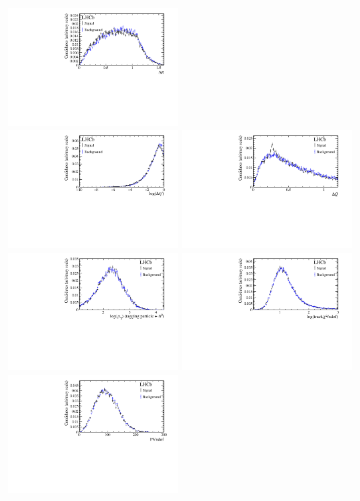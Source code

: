 \begin{figure}[tbp]
\begin{center}
		\includegraphics[width=0.40\textwidth]{09FlavourTagging/figs/BDT_TagPart_B_deltaR.pdf}\\
		\includegraphics[width=0.40\textwidth]{09FlavourTagging/figs/BDT_deta_flat_log.pdf}
		\includegraphics[width=0.40\textwidth]{09FlavourTagging/figs/BDT_TagPart_B_DeltaQ_pion.pdf}\\
		\includegraphics[width=0.40\textwidth]{09FlavourTagging/figs/BDT_TagPart_B_Combined_Pt_log.pdf}
		\includegraphics[width=0.40\textwidth]{09FlavourTagging/figs/BDT_cs_flat.pdf}\\
		\includegraphics[width=0.40\textwidth]{09FlavourTagging/figs/BDT_PVndof.pdf}

\end{center}
\end{figure}
